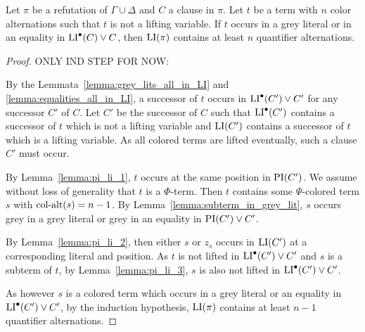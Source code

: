 \documentclass[,%
	draft=false,%
	numbers=noendperiod
	12pt,
	a4paper,
	oneside,%
	openany,
]{memoir}
\begin{document}
{
	\color{gray}
	\begin{clemma}
		Let $\pi$ be a refutation of $\Gamma \cup \Delta$ and $C$ a clause in $\pi$.
		Let $t$ be a term with $n$ color alternations such that $t$ is not a lifting variable.
		If $t$ occurs in a grey literal or in an equality in $\operatorname{LI}^\bullet(C) \lor C$, then $\operatorname{LI}(\pi)$ contains at least $n$ quantifier alternations.
	\end{clemma}
	\begin{proof}
		ONLY IND STEP FOR NOW: 


		By the Lemmata~\ref{lemma:grey_lits_all_in_LI} and \ref{lemma:equalities_all_in_LI}, a successor of $t$ occurs in $\operatorname{LI}^\bullet(C') \lor C'$ for any successor $C'$ of $C$.
		Let $C'$ be the successor of $C$ such that $\operatorname{LI}^\bullet(C')$ contains a successor of $t$ which is not a lifting variable and $\operatorname{LI}(C')$ contains a successor of $t$ which is a lifting variable.
		As all colored terms are lifted eventually, such a clause $C'$ must occur.


		By Lemma~\ref{lemma:pi_li_1}, $t$ occurs at the same position in $\operatorname{PI}(C')$.
		We assume without loss of generality that $t$ is a $\Phi$-term.
		Then $t$ contains some $\Psi$-colored term $s$ with $\operatorname{col-alt}(s) = n-1$.
		By Lemma~\ref{lemma:subterm_in_grey_lit}, $s$ occurs grey in a grey literal or grey in an equality in $\operatorname{PI}(C')\lor C'$.

		By Lemma~\ref{lemma:pi_li_2}, then either $s$ or $z_s$ occurs in $\operatorname{LI}(C')$  at a corresponding literal and position. 
		As $t$ is not lifted in $\operatorname{LI}^\bullet(C') \lor C'$ and $s$ is a subterm of $t$, by Lemma~\ref{lemma:pi_li_3}, $s$ is also not lifted in $\operatorname{LI}^\bullet(C') \lor C'$.

		As however $s$ is a colored term which occurs in a grey literal or an equality in $\operatorname{LI}^\bullet(C') \lor C'$, by the induction hypothesis, $\operatorname{LI}(\pi)$ contains at least $n-1$ quantifier alternations. 


	\end{proof}
}

\end{document}
